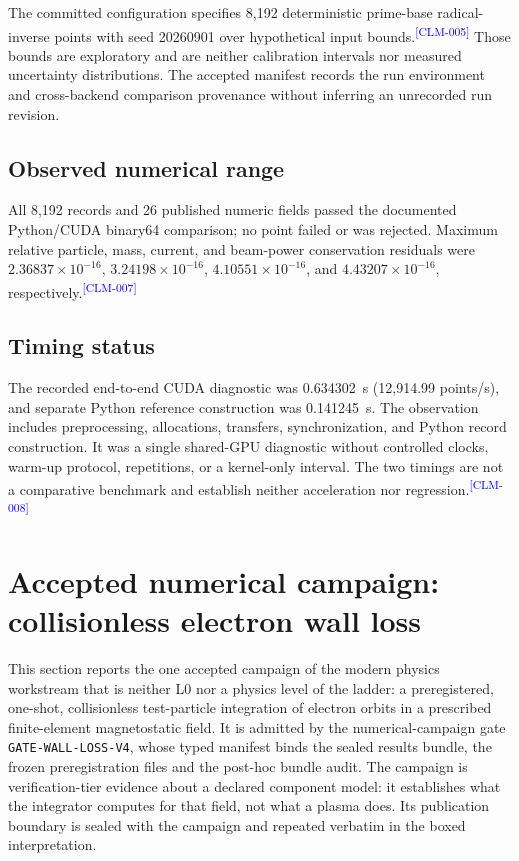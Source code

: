 \documentclass[11pt]{article}
\newcommand{\EvidenceClaim}[2]{#2\textsuperscript{\textcolor{blue}{[#1]}}}
\begin{document}
\EvidenceClaim{CLM-005}{The committed configuration specifies 8,192 deterministic
prime-base radical-inverse points with seed 20260901 over hypothetical input
bounds.} Those bounds are exploratory and are
neither calibration intervals nor measured uncertainty distributions. The
accepted manifest records the run environment and cross-backend comparison
provenance without inferring an unrecorded run revision.

\subsection{Observed numerical range}



\EvidenceClaim{CLM-007}{All 8,192 records and 26 published numeric fields passed
the documented Python/CUDA binary64 comparison; no point failed or was
rejected. Maximum relative particle, mass, current, and beam-power conservation
residuals were $2.36837\times10^{-16}$, $3.24198\times10^{-16}$,
$4.10551\times10^{-16}$, and $4.43207\times10^{-16}$, respectively.}

\subsection{Timing status}

\EvidenceClaim{CLM-008}{The recorded end-to-end CUDA diagnostic was 0.634302~s
(12,914.99 points/s), and separate Python reference construction was
0.141245~s. The observation includes preprocessing, allocations, transfers,
synchronization, and Python record construction. It was a single shared-GPU
diagnostic without controlled clocks, warm-up protocol, repetitions, or a
kernel-only interval. The two timings are not a comparative benchmark and
establish neither acceleration nor regression.}

\section{Accepted numerical campaign: collisionless electron wall loss}

This section reports the one accepted campaign of the modern physics
workstream that is neither L0 nor a physics level of the ladder: a
preregistered, one-shot, collisionless test-particle integration of electron
orbits in a prescribed finite-element magnetostatic field. It is admitted by
the numerical-campaign gate \texttt{GATE-WALL-LOSS-V4}, whose typed manifest
binds the sealed results bundle, the frozen preregistration files and the
post-hoc bundle audit. The campaign is verification-tier evidence about a
declared component model: it establishes what the integrator computes for that
field, not what a plasma does. Its publication boundary is sealed with the
campaign and repeated verbatim in the boxed interpretation.
\end{document}
